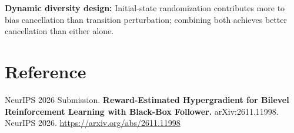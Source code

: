\documentclass[10pt,twocolumn]{article}
\begin{document}
\textbf{Dynamic diversity design:} Initial-state randomization contributes more
to bias cancellation than transition perturbation; combining both achieves better
cancellation than either alone.

\section*{Reference}

NeurIPS 2026 Submission.
\textbf{Reward-Estimated Hypergradient for Bilevel Reinforcement Learning
with Black-Box Follower.}
arXiv:2611.11998. NeurIPS 2026.
\url{https://arxiv.org/abs/2611.11998}
\end{document}
